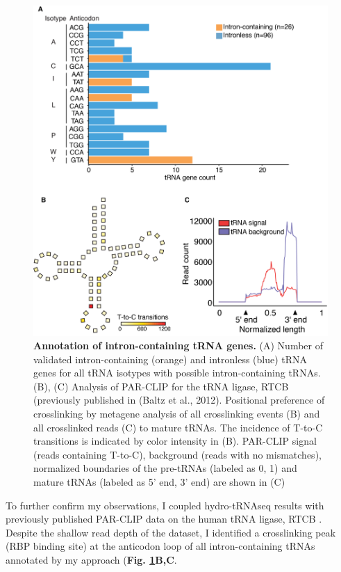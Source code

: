 \documentclass[12pt]{rockefeller}
\begin{document}
\newpage
\begin{figure}[!hb]%
\centering
\includegraphics[width=\textwidth]{paper5.png}%
\caption[Annotation of intron-containing tRNA genes.]
{\textbf{Annotation of intron-containing tRNA genes.}
(A) Number of validated intron-containing (orange) and intronless (blue) tRNA genes for all tRNA isotypes with possible intron-containing tRNAs. (B), (C) Analysis of PAR-CLIP for the tRNA ligase, RTCB (previously published in (Baltz et al., 2012). Positional preference of crosslinking by metagene analysis of all crosslinking events (B) and all crosslinked reads (C) to mature tRNAs. The incidence of T-to-C transitions is indicated by color intensity in (B). PAR-CLIP signal (reads containing T-to-C), background (reads with no mismatches), normalized boundaries of the pre-tRNAs (labeled as 0, 1) and mature tRNAs (labeled as 5’ end, 3’ end) are shown in (C)
}
\centering
\label{paper5}%
\end{figure}

To further confirm my observations, I coupled hydro-tRNAseq results with previously published PAR-CLIP data on the human tRNA ligase, RTCB \cite{Baltz:2012bh}. Despite the shallow read depth of the dataset, I identified a crosslinking peak (RBP binding site) at the anticodon loop of all intron-containing tRNAs annotated by my approach (\textbf{Fig. \ref{paper5}B,C}. 
\end{document}
